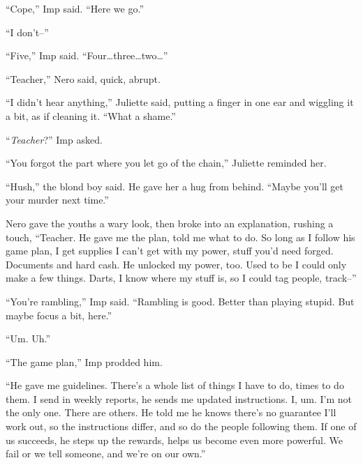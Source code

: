 ``Cope,'' Imp said.  ``Here we go.''



``I don't--''



``Five,'' Imp said.  ``Four\ldots three\ldots two\ldots''



``Teacher,'' Nero said, quick, abrupt.



``I didn't hear anything,'' Juliette said, putting a finger in one ear and wiggling it a bit, as if cleaning it.  ``What a shame.''



``\emph{Teacher}?''  Imp asked.



``You forgot the part where you let go of the chain,'' Juliette reminded her.



``Hush,'' the blond boy said.  He gave her a hug from behind.  ``Maybe you'll get your murder next time.''



Nero gave the youths a wary look, then broke into an explanation, rushing a touch, ``Teacher.  He gave me the plan, told me what to do.  So long as I follow his game plan, I get supplies I can't get with my power, stuff you'd need forged.  Documents and hard cash.  He unlocked my power, too.  Used to be I could only make a few things.  Darts, I know where my stuff is, so I could tag people, track--''



``You're rambling,'' Imp said.  ``Rambling is good.  Better than playing stupid.  But maybe focus a bit, here.''



``Um.  Uh.''



``The game plan,'' Imp prodded him.



``He gave me guidelines.  There's a whole list of things I have to do, times to do them.  I send in weekly reports, he sends me updated instructions.  I, um.  I'm not the only one.  There are others.  He told me he knows there's no guarantee I'll work out, so the instructions differ, and so do the people following them.  If one of us succeeds, he steps up the rewards, helps us become even more powerful.  We fail or we tell someone, and we're on our own.''



